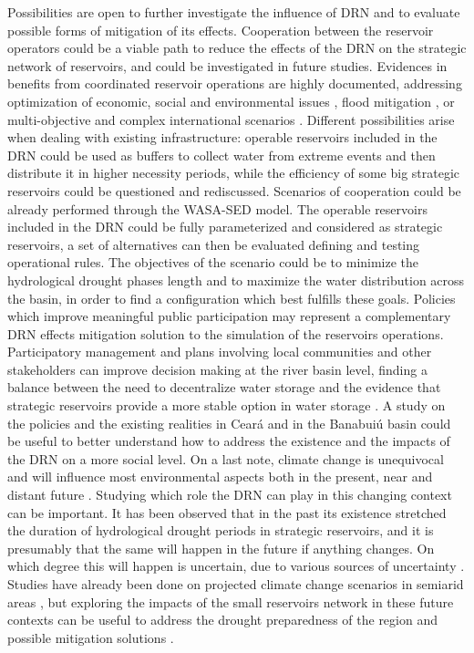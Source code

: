 \documentclass[draft]{agujournal2019}
\begin{document}
Possibilities are open to further investigate the influence of DRN and to evaluate possible forms of mitigation of its effects. Cooperation between the reservoir operators could be a viable path to reduce the effects of the DRN on the strategic network of reservoirs, and could be investigated in future studies. Evidences in benefits from coordinated reservoir operations are highly documented, addressing optimization of economic, social and environmental issues \cite{Castelletti2008}, flood mitigation \cite{Seibert2014}, or multi-objective and complex international scenarios \cite{Giuliani2021}. Different possibilities arise when dealing with existing infrastructure: operable reservoirs included in the DRN could be used as buffers to collect water from extreme events and then distribute it in higher necessity periods, while the efficiency of some big strategic reservoirs could be questioned and rediscussed. Scenarios of cooperation could be already performed through the WASA-SED model. The operable reservoirs included in the DRN could be fully parameterized and considered as strategic reservoirs, a set of alternatives can then be evaluated defining and testing operational rules. The objectives of the scenario could be to minimize the hydrological drought phases length and to maximize the water distribution across the basin, in order to find a configuration which best fulfills these goals. Policies which improve meaningful public participation may represent a complementary DRN effects mitigation solution to the simulation of the reservoirs operations. Participatory management and plans involving local communities and other stakeholders can improve decision making at the river basin level, finding a balance between the need to decentralize water storage and the evidence that strategic reservoirs provide a more stable option in water storage \cite{Lemos2007,DeLiraAzevedo2017}. A study on the policies and the existing realities in Ceará and in the Banabuiú basin could be useful to better understand how to address the existence and the impacts of the DRN on a more social level. On a last note, climate change is unequivocal and will influence most environmental aspects both in the present, near and distant future \cite{IPCC2021}. Studying which role the DRN can play in this changing context can be important. It has been observed that in the past its existence stretched the duration of hydrological drought periods in strategic reservoirs, and it is presumably that the same will happen in the future if anything changes. On which degree this will happen is uncertain, due to various sources of uncertainty \cite{Hattermann2018,Randall2007}. Studies have already been done on projected climate change scenarios in semiarid areas \cite{Zhao2014,Marengo2020,Marengo2017}, but exploring the impacts of the small reservoirs network in these future contexts can be useful to address the drought preparedness of the region and possible mitigation solutions \cite{Gutierrez2014}.
\end{document}
